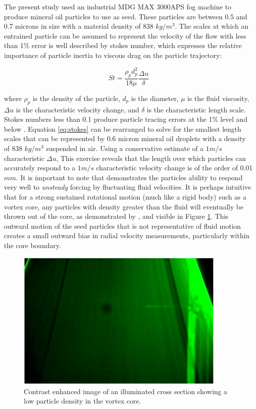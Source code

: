 The present study used an industrial MDG MAX 
3000APS fog machine to produce mineral oil particles to use as seed. These 
particles are between 0.5 and 0.7 microns in size with a material density of 
838 $kg/m^3$. The scales at which an entrained particle can 
be assumed to represent the velocity of the flow with less than 1\% error is 
well described by stokes number, which expresses the relative importance of 
particle inertia to viscous drag on the particle trajectory:

\begin{equation}
St = \frac{\rho_p d^{2}_{p}}{18 \mu} \frac{\Delta u}{\delta}
	\label{eq:stokes}
\end{equation}

\noindent
where $\rho_p$ is the density of the particle, $d_p$ is the diameter, $\mu$ is 
the fluid viscosity, $\Delta u$ is the characteristic velocity change, and 
$\delta$ is the characteristic length scale. Stokes numbers less than 0.1 
produce particle tracing errors at the 1\% level and below \cite{brennen2005}.
Equation \ref{eq:stokes} can be rearranged to solve for the smallest length 
scales that can be represented by 0.6 micron mineral oil droplets with a 
density of 838 $kg/m^3$ suspended in air. Using a conservative estimate of a $1 
m/s$ characteristic $\Delta u$, This exercise reveals that the length over 
which particles can accurately respond to a $1 m/s$ characteristic velocity 
change is of the order of 0.01 $mm$. It is important to note that demonstrates 
the particles ability to respond very well to \textit{unsteady} forcing by 
fluctuating fluid velocities. It is perhaps intuitive that for a strong 
sustained rotational motion (much like a rigid body) such as a vortex core, any 
particles with density 
greater than the fluid will eventually be thrown out of the core, as 
demonstrated by \cite{lang1999}, and visible in Figure 
\ref{fig:vortex_core_particles}. This outward motion of the seed particles that 
is not representative of fluid motion creates a small outward bias in radial 
velocity measurements, particularly within the core boundary.

\vspace{32pt}
\begin{figure}[H]
	\centering
	\includegraphics[width=4in]{figs/piv_method/vortex_core}
	\caption{Contrast enhanced image of an illuminated cross section showing a 
		low particle density in the vortex core.}
	\label{fig:vortex_core_particles}
\end{figure}
\vspace{16pt}

